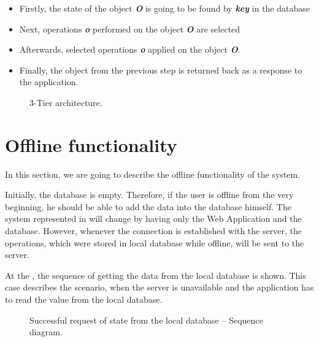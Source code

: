 \begin{itemize}
\item Firstly, the state of the object \textit{\textbf{O}} is going to be found by \textit{\textbf{key}} in the database
\item Next, operations \textit{\textbf{o}} performed on the object \textit{\textbf{O}} are selected
\item Afterwards, selected operations \textit{\textbf{o}} applied on the object \textit{\textbf{O}}.
\item Finally, the object from the previous step is returned back as a response to the application.
\end{itemize} 


\begin{figure}[!htb]
    \begin{center}
    \def\svgwidth{\linewidth}
    
    \caption {3-Tier architecture.}
    \label{fig:dev1}
\end{center}
\end{figure}



\section{Offline functionality}

In this section, we are going to describe the offline functionality of the system.

Initially, the database is empty. Therefore, if the user is offline from the very beginning, he should be able to add the data into the database himself. 
The system represented in  will change by having only the Web Application and the database. However, whenever the connection is established with the server, the operations, which were stored in local database while offline, will be sent to the server. 

At the , the sequence of getting the data from the local database is shown. This case describes the scenario, when the server is unavailable and the application has to read the value from the local database. 

\begin{figure}[!htb]
    \begin{center}
    \def\svgwidth{\columnwidth}
    
    \caption {Successful request of state from the local database -- Sequence diagram.}
    \label{fig:design6}
\end{center}
\end{figure}


